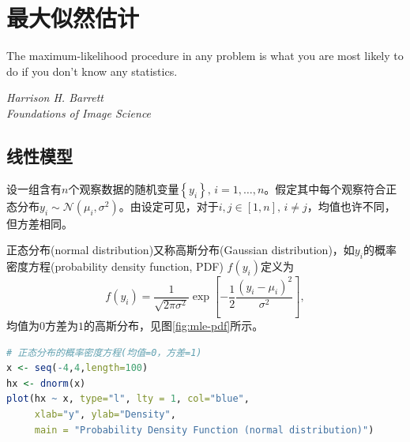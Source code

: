 \chapter{最大似然估计}
\label{sec:mle-model}

\epigraph{The maximum-likelihood procedure in any problem is what you are most likely to do if you don’t know any statistics.}{\textit{Harrison H. Barrett \\ Foundations of Image Science}}

\section{线性模型}
\label{sec:linear-model}

设一组含有$n$个观察数据的随机变量$\left\{ y_{i} \right\}, \, i = 1,\ldots,n$。假定其中每个观察符合正态分布$y_{i} \sim \mathcal{N} \left( \mu_{i}, \sigma^{2} \right)$。由设定可见，对于$i,j \in [1,n], \, i \neq j$，均值也许不同，但方差相同。

正态分布(normal distribution)又称高斯分布(Gaussian distribution)，如$y_{i}$的概率密度方程(probability density function, PDF) $f\left( y_{i} \right)$定义为
\begin{equation}
  \label{eq:mle-pdf-def}
  f \left( y_{i} \right) = \frac{1}{\sqrt{2 \pi \sigma^{2}}}
  \exp \left[
  - \frac{1}{2} \frac{
  \left( y_{i} - \mu_{i} \right)^{2}
  }{
  \sigma^{2}
  }
   \right],
\end{equation}
均值为$0$方差为$1$的高斯分布，见图\ref{fig:mle-pdf}所示。

\begin{lstlisting}[language=R]
# 正态分布的概率密度方程(均值=0，方差=1)
x <- seq(-4,4,length=100)
hx <- dnorm(x)
plot(hx ~ x, type="l", lty = 1, col="blue",
     xlab="y", ylab="Density",
     main = "Probability Density Function (normal distribution)")
\end{lstlisting}

